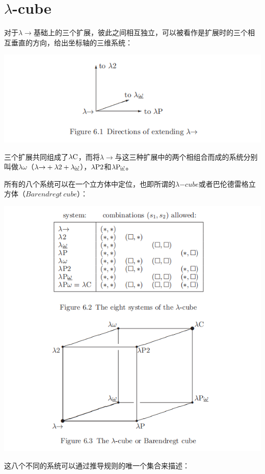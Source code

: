 \documentclass[UTF8]{article}
\begin{document}
	\section{$\lambda$-cube}
	\noindent
	对于$\lambda{\rightarrow}$基础上的三个扩展，彼此之间相互独立，可以被看作是扩展时的三个相互垂直的方向，给出坐标轴的三维系统：
		
		\noindent
		\includegraphics[width=0.93\linewidth]{"../imgs/6-2.png"}
		
		三个扩展共同组成了$\lambda{\rm C}$，而将$\lambda{\rightarrow}$与这三种扩展中的两个相组合而成的系统分别叫做$\lambda{\omega}$（$\lambda{\rightarrow}+\lambda{2}+\lambda{\uline{\omega}}$），$\lambda{\rm P2}$和$\lambda{\rm P\uline{\omega}}$。
		
		所有的八个系统可以在一个立方体中定位，也即所谓的$\lambda{-{cube}}$或者巴伦德雷格立方体（$Barendregt\ cube$）：
		
		\noindent
		\includegraphics[width=0.93\linewidth]{"../imgs/6-3.png"}
		
		这八个不同的系统可以通过推导规则的唯一个集合来描述：
		
\end{document}
